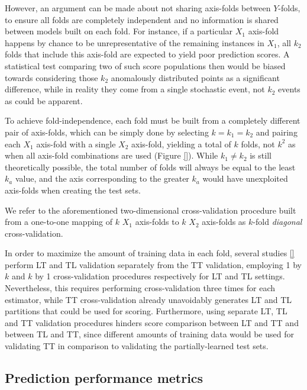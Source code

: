 However, an argument can be made about not sharing axis-folds between $Y$-folds, to ensure all folds are completely independent and no information is shared between models built on each fold. For instance, if a particular $X_1$ axis-fold happens by chance to be unrepresentative of the remaining instances in $X_1$, all $k_2$ folds that include this axis-fold are expected to yield poor prediction scores. A statistical test comparing two of such score populations then would be biased towards considering those $k_2$ anomalously distributed points as a significant difference, while in reality they come from a single stochastic event, not $k_2$ events as could be apparent.

To achieve fold-independence, each fold must be built from a completely different pair of axis-folds, which can be simply done by selecting $k=k_1=k_2$ and pairing each $X_1$ axis-fold with a single $X_2$ axis-fold, yielding a total of $k$ folds, not $k^2$ as when all axis-fold combinations are used (Figure \ref{}). While $k_1\neq k_2$ is still theoretically possible, the total number of folds will always be equal to the least $k_a$ value, and the axis corresponding to the greater $k_a$ would have unexploited axis-folds when creating the test sets.

We refer to the aforementioned two-dimensional cross-validation procedure built from a one-to-one mapping of $k$ $X_1$ axis-folds to $k$ $X_2$ axis-folds as $k$-fold \emph{diagonal} cross-validation.


In order to maximize the amount of training data in each fold, several studies \ref{} perform LT and TL validation separately from the TT validation, employing 1 by $k$ and $k$ by 1 cross-validation procedures respectively for LT and TL settings. Nevertheless, this requires performing cross-validation three times for each estimator, while TT cross-validation already unavoidably generates LT and TL partitions that could be used for scoring. Furthermore, using separate LT, TL and TT validation procedures hinders score comparison between LT and TT and between TL and TT, since different amounts of training data would be used for validating TT in comparison to validating the partially-learned test sets.


\subsection{Prediction performance metrics}  %
\label{sec:prediction_metrics}


